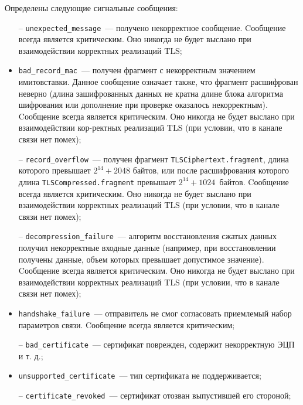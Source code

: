 Определены следующие сигнальные сообщения:
\begin{itemize}
\item[--]
\lstinline{unexpected_message}~--- получено некорректное сообщение. 
Cообщение всегда является критическим. Оно никогда не будет выслано при 
взаимодействии корректных реализаций TLS; 

\item[--]
\lstinline{bad_record_mac}~--- получен фрагмент с некорректным 
значением имитовставки. Данное сообщение означает также, что фрагмент 
расшифрован неверно (длина зашифрованных данных не кратна длине блока 
алгоритма шифрования или дополнение при проверке оказалось некорректным). 
Cообщение всегда является критическим. Оно никогда не будет выслано при 
взаимодействии кор-ректных реализаций TLS (при условии, что в канале связи 
нет помех); 

\item[--]
\lstinline{record_overflow}~--- получен фрагмент 
\lstinline{TLSCiphertext.fragment}, длина которого превышает $2^{14} + 2048$ 
байтов, или после расшифрования которого длина 
\lstinline{TLSCompressed.fragment} превышает $2^{14} + 1024$~байтов. 
Cообщение всегда является критическим. Оно никогда не будет выслано при 
взаимодействии корректных реализаций TLS (при условии, что в канале связи 
нет помех);  

\item[--]
\lstinline{decompression_failure}~--- алгоритм восстановления сжатых 
данных получил некорректные входные данные (например, при восстановлении 
получены данные, объем которых превышает допустимое значение). Cообщение 
всегда является критическим. Оно никогда не будет выслано при 
взаимодействии корректных реализаций TLS (при условии, что в канале связи 
нет помех); 

\item[--]
\lstinline{handshake_failure}~--- отправитель не смог согласовать 
приемлемый набор параметров связи. Cообщение всегда является критическим; 

\item[--]
\lstinline{bad_certificate}~--- сертификат поврежден, содержит 
некорректную ЭЦП и т. д.; 

\item[--]
\lstinline{unsupported_certificate}~--- тип сертификата не 
поддерживается; 

\item[--]
\lstinline{certificate_revoked}~--- сертификат отозван выпустившей 
его стороной; 


\end{itemize}
